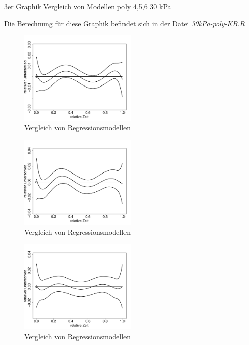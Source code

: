 \documentclass[12pt,a4paper]{article}
\theoremstyle{definition}
\theoremstyle{definition}
\theoremstyle{definition}
\theoremstyle{definition}
\begin{document}
3er Graphik Vergleich von Modellen poly 4,5,6 30 kPa

Die Berechnung für diese Graphik befindet sich in der Datei \textit{30kPa-poly-KB.R}

\begin{figure}[H] 
  \centering
     \includegraphics[width=0.5\textwidth]{30kPa-poly-KB-4-5.pdf}
  \caption{Vergleich von Regressionsmodellen}
  \label{fig:12}
\end{figure}

\begin{figure}[H] 
  \centering
     \includegraphics[width=0.5\textwidth]{30kPa-poly-KB-4-6.pdf}
  \caption{Vergleich von Regressionsmodellen}
  \label{fig:12.1}
\end{figure}

\begin{figure}[H] 
  \centering
     \includegraphics[width=0.5\textwidth]{30kPa-poly-KB-5-6.pdf}
  \caption{Vergleich von Regressionsmodellen}
  \label{fig:12.2}
\end{figure}
\end{document}
